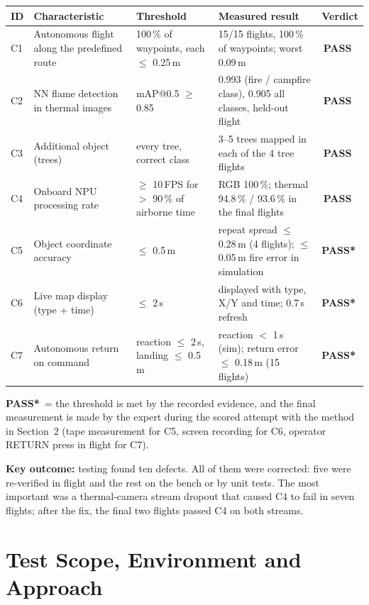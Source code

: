 \documentclass[10pt,a4paper]{article}
\newcommand{\PASS}{\textcolor{passgreen}{\textbf{\ding{51}\,PASS}}}
\newcommand{\PART}{\textcolor{warnamber}{\textbf{PASS*}}}
\newcommand{\head}[1]{\textbf{#1}}
\begin{document}
\begin{tabularx}{\textwidth}{|L{0.7cm}|L{4.0cm}|L{2.7cm}|Y|L{1.9cm}|}
\hline
{}\head{ID} & \head{Characteristic} & \head{Threshold} & \head{Measured result} & \head{Verdict} \\ \hline
C1 & Autonomous flight along the predefined route & 100\,\% of waypoints, each $\le$ 0.25\,m & 15/15 flights, 100\,\% of waypoints; worst 0.09\,m & \PASS \\ \hline
C2 & NN flame detection in thermal images & mAP@0.5 $\ge$ 0.85 & 0.993 (fire / campfire class), 0.905 all classes, held-out flight & \PASS \\ \hline
C3 & Additional object (trees) & every tree, correct class & 3--5 trees mapped in each of the 4 tree flights & \PASS \\ \hline
C4 & Onboard NPU processing rate & $\ge$ 10\,FPS for $>$ 90\,\% of airborne time & RGB 100\,\%; thermal 94.8\,\% / 93.6\,\% in the final flights & \PASS \\ \hline
C5 & Object coordinate accuracy & $\le$ 0.5\,m & repeat spread $\le$ 0.28\,m (4 flights); $\le$ 0.05\,m fire error in simulation & \PART \\ \hline
C6 & Live map display (type + time) & $\le$ 2\,s & displayed with type, X/Y and time; 0.7\,s refresh & \PART \\ \hline
C7 & Autonomous return on command & reaction $\le$ 2\,s, landing $\le$ 0.5\,m & reaction $<$ 1\,s (sim); return error $\le$ 0.18\,m (15 flights) & \PART \\ \hline
\end{tabularx}

{\small \PART\ = the threshold is met by the recorded evidence, and the final measurement is made by the expert
during the scored attempt with the method in Section~2 (tape measurement for C5, screen recording for C6, operator
RETURN press in flight for C7).}

\textbf{Key outcome:} testing found ten defects. All of them were corrected: five were re-verified in flight and the rest on the bench or by unit tests. The
most important was a thermal-camera stream dropout that caused C4 to fail in seven flights; after the fix, the final
two flights passed C4 on both streams.

\section{Test Scope, Environment and Approach}
\end{document}
